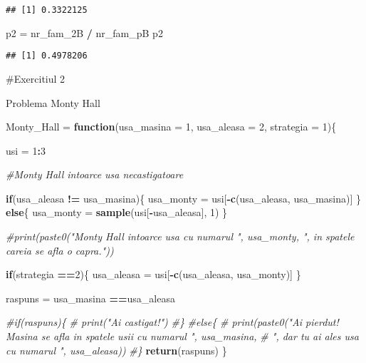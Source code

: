 \documentclass[
]{article}
\newenvironment{Shaded}{\begin{snugshade}}{\end{snugshade}}
\newcommand{\CommentTok}[1]{\textcolor[rgb]{0.56,0.35,0.01}{\textit{#1}}}
\newcommand{\ControlFlowTok}[1]{\textcolor[rgb]{0.13,0.29,0.53}{\textbf{#1}}}
\newcommand{\DataTypeTok}[1]{\textcolor[rgb]{0.13,0.29,0.53}{#1}}
\newcommand{\DecValTok}[1]{\textcolor[rgb]{0.00,0.00,0.81}{#1}}
\newcommand{\KeywordTok}[1]{\textcolor[rgb]{0.13,0.29,0.53}{\textbf{#1}}}
\newcommand{\NormalTok}[1]{#1}
\newcommand{\OperatorTok}[1]{\textcolor[rgb]{0.81,0.36,0.00}{\textbf{#1}}}
\newcommand{\StringTok}[1]{\textcolor[rgb]{0.31,0.60,0.02}{#1}}
\begin{document}
\begin{verbatim}
## [1] 0.3322125
\end{verbatim}

\begin{Shaded}
\begin{Highlighting}[]
\NormalTok{p2 =}\StringTok{ }\NormalTok{nr_fam_2B }\OperatorTok{/}\StringTok{ }\NormalTok{nr_fam_pB}
\NormalTok{p2}
\end{Highlighting}
\end{Shaded}

\begin{verbatim}
## [1] 0.4978206
\end{verbatim}

\#Exercitiul 2

Problema Monty Hall

\begin{Shaded}
\begin{Highlighting}[]
\NormalTok{Monty_Hall =}\StringTok{ }\ControlFlowTok{function}\NormalTok{(}\DataTypeTok{usa_masina =} \DecValTok{1}\NormalTok{, }\DataTypeTok{usa_aleasa =} \DecValTok{2}\NormalTok{, }\DataTypeTok{strategia =} \DecValTok{1}\NormalTok{)\{}
  
\NormalTok{  usi =}\StringTok{ }\DecValTok{1}\OperatorTok{:}\DecValTok{3}
  
  \CommentTok{#Monty Hall intoarce usa necastigatoare}
  
  \ControlFlowTok{if}\NormalTok{(usa_aleasa }\OperatorTok{!=}\StringTok{ }\NormalTok{usa_masina)\{}
\NormalTok{    usa_monty =}\StringTok{ }\NormalTok{usi[}\OperatorTok{-}\KeywordTok{c}\NormalTok{(usa_aleasa, usa_masina)]}
\NormalTok{  \}}
  \ControlFlowTok{else}\NormalTok{\{}
\NormalTok{    usa_monty =}\StringTok{ }\KeywordTok{sample}\NormalTok{(usi[}\OperatorTok{-}\NormalTok{usa_aleasa], }\DecValTok{1}\NormalTok{)}
\NormalTok{  \}}
  
  \CommentTok{#print(paste0("Monty Hall intoarce usa cu numarul ", usa_monty, ", in spatele careia se afla o capra."))}
  
  \ControlFlowTok{if}\NormalTok{(strategia }\OperatorTok{==}\DecValTok{2}\NormalTok{)\{}
\NormalTok{    usa_aleasa =}\StringTok{ }\NormalTok{usi[}\OperatorTok{-}\KeywordTok{c}\NormalTok{(usa_aleasa, usa_monty)]}
\NormalTok{  \}}
  
\NormalTok{  raspuns =}\StringTok{ }\NormalTok{usa_masina }\OperatorTok{==}\NormalTok{usa_aleasa}
  
  \CommentTok{#if(raspuns)\{}
  \CommentTok{#  print("Ai castigat!")}
  \CommentTok{#\}}
  \CommentTok{#else\{}
  \CommentTok{#  print(paste0("Ai pierdut! Masina se afla in spatele usii cu numarul ", usa_masina, }
  \CommentTok{#        ", dar tu ai ales usa cu numarul ", usa_aleasa))}
  \CommentTok{#\}}
  \KeywordTok{return}\NormalTok{(raspuns)}
\NormalTok{\}}
\end{Highlighting}
\end{Shaded}
\end{document}
